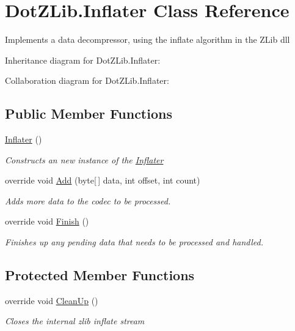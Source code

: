 \hypertarget{class_dot_z_lib_1_1_inflater}{\section{Dot\+Z\+Lib.\+Inflater Class Reference}
\label{class_dot_z_lib_1_1_inflater}
}


Implements a data decompressor, using the inflate algorithm in the Z\+Lib dll  




Inheritance diagram for Dot\+Z\+Lib.\+Inflater\+:


Collaboration diagram for Dot\+Z\+Lib.\+Inflater\+:
\subsection*{Public Member Functions}
\begin{DoxyCompactItemize}
\item 
\hyperlink{class_dot_z_lib_1_1_inflater_acb40e9664a78756a3def8ed66aa35ca1}{Inflater} ()
\begin{DoxyCompactList}\small\item\em Constructs an new instance of the {\ttfamily \hyperlink{class_dot_z_lib_1_1_inflater}{Inflater}} \end{DoxyCompactList}\item 
override void \hyperlink{class_dot_z_lib_1_1_inflater_a773dd62fe806dd9b6117f859faaeb079}{Add} (byte\mbox{[}$\,$\mbox{]} data, int offset, int count)
\begin{DoxyCompactList}\small\item\em Adds more data to the codec to be processed. \end{DoxyCompactList}\item 
override void \hyperlink{class_dot_z_lib_1_1_inflater_aa70c9d026f5d1b44fe0679b78973285c}{Finish} ()
\begin{DoxyCompactList}\small\item\em Finishes up any pending data that needs to be processed and handled. \end{DoxyCompactList}\end{DoxyCompactItemize}
\subsection*{Protected Member Functions}
\begin{DoxyCompactItemize}
\item 
override void \hyperlink{class_dot_z_lib_1_1_inflater_af4ed4f530151f83222d2cb732a77626b}{Clean\+Up} ()
\begin{DoxyCompactList}\small\item\em Closes the internal zlib inflate stream \end{DoxyCompactList}\end{DoxyCompactItemize}
